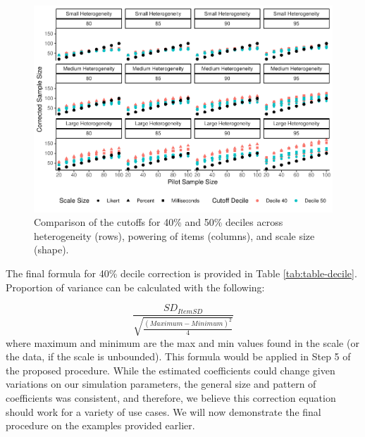 \documentclass[
  man]{apa7}
\begin{document}
\begin{figure}
\centering
\includegraphics{manuscript_draft_files/figure-latex/decile-figure-1.pdf}
\caption{\label{fig:decile-figure}Comparison of the cutoffs for 40\% and 50\% deciles across heterogeneity (rows), powering of items (columns), and scale size (shape).}
\end{figure}

The final formula for 40\% decile correction is provided in Table \ref{tab:table-decile}. Proportion of variance can be calculated with the following:

\[\frac{SD_{Item SD}}{\sqrt{\frac{(Maximum - Minimum)^2}{4}}}\] where maximum and minimum are the max and min values found in the scale (or the data, if the scale is unbounded). This formula would be applied in Step 5 of the proposed procedure. While the estimated coefficients could change given variations on our simulation parameters, the general size and pattern of coefficients was consistent, and therefore, we believe this correction equation should work for a variety of use cases. We will now demonstrate the final procedure on the examples provided earlier.
\end{document}
